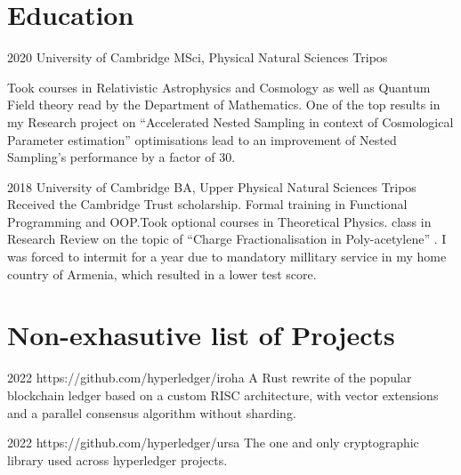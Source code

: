 \documentclass{CurriculumVitae}[10pt, condensed]
\begin{document}
\section*{Education}%

%
{2020}%
{University of Cambridge}%
{MSci, }%
{Physical Natural Sciences Tripos}%
{%

  Took courses in Relativistic Astrophysics and Cosmology as
  well as Quantum Field theory read by the Department of
  Mathematics. One of the top results in my Research project
  on ``Accelerated Nested Sampling in context of
  Cosmological Parameter estimation''%
  optimisations lead to an improvement of Nested Sampling's
  performance by a factor of 30.
}%


%
{2018}%
{University of Cambridge}%
{BA, Upper }%
{Physical Natural Sciences Tripos}%
{
  Received the Cambridge Trust scholarship. Formal training
  in Functional Programming and OOP.\@ Took optional courses
  in Theoretical Physics.  class in Research Review
  on the topic of ``Charge Fractionalisation in Poly-acetylene''%
  \cite{charge-frac}. I was forced to intermit for a year due to
  mandatory millitary service in my home country of Armenia,
  which resulted in a lower test score.
}

\vfill
\section*{Non-exhasutive list of Projects}%
%
%
{2022}%
{https://github.com/hyperledger/iroha}%
{%
  A Rust rewrite of the popular blockchain ledger based on a custom
  RISC architecture, with vector extensions and a parallel consensus
  algorithm without sharding.
}%

%
{2022}%
{https://github.com/hyperledger/ursa}%
{%
  The one and only cryptographic library used across hyperledger
  projects.
}%
\end{document}
